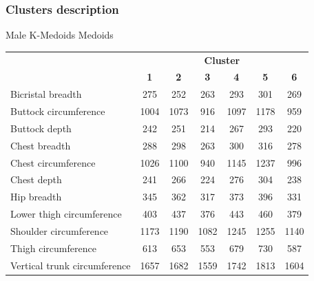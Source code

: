 \documentclass[10pt]{beamer}
\begin{document}
\subsubsection{Clusters description}
\begin{frame}{Male K-Medoids Medoids}
	\scriptsize
	\centering
	\begin{tabular}{lcccccc}
		\cline{2-7}
		                             & \multicolumn{6}{c}{\textbf{Cluster}}                                                                  \\
		                             & \textbf{1}                           & \textbf{2} & \textbf{3} & \textbf{4} & \textbf{5} & \textbf{6} \\
		\hline\hline
		Bicristal breadth            & 275                                  & 252        & 263        & 293        & 301        & 269        \\
		Buttock circumference        & 1004                                 & 1073       & 916        & 1097       & 1178       & 959        \\
		Buttock depth                & 242                                  & 251        & 214        & 267        & 293        & 220        \\
		Chest breadth                & 288                                  & 298        & 263        & 300        & 316        & 278        \\
		Chest circumference          & 1026                                 & 1100       & 940        & 1145       & 1237       & 996        \\
		Chest depth                  & 241                                  & 266        & 224        & 276        & 304        & 238        \\
		Hip breadth                  & 345                                  & 362        & 317        & 373        & 396        & 331        \\
		Lower thigh circumference    & 403                                  & 437        & 376        & 443        & 460        & 379        \\
		Shoulder circumference       & 1173                                 & 1190       & 1082       & 1245       & 1255       & 1140       \\
		Thigh circumference          & 613                                  & 653        & 553        & 679        & 730        & 587        \\
		Vertical trunk circumference & 1657                                 & 1682       & 1559       & 1742       & 1813       & 1604       \\

\end{tabular}
\end{frame}
\end{document}
